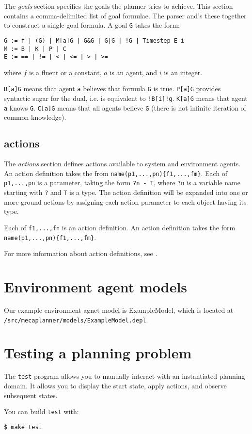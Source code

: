 \documentclass{article}
\begin{document}
The \emph{goals} section specifies the goals the planner tries to achieve.
This section contains a comma-delimited list of goal formulae. The parser and's
these together to construct a single goal formula. A goal \verb|G| takes the form:

\begin{lstlisting}
G := f | (G) | M[a]G | G&G | G|G | !G | Timestep E i
M := B | K | P | C
E := == | != | < | <= | > | >=
\end{lstlisting}

\noindent
where $f$ is a fluent or a constant, $a$ is an agent, 
and $i$ is an integer.

\verb|B[a]G| means that agent \verb|a| believes that formula \verb|G| is true.
\verb|P[a]G| provides syntactic sugar for the dual, i.e. is equivalent to
\verb|!B[i]!g|.
\verb|K[a]G| means that agent \verb|a| knows \verb|G|.
\verb|C[a]G| means that all agents believe \verb|G| 
(there is not infinite iteration of common knowledge).


\subsection{actions}

The \emph{actions} section defines actions available to system and environment
agents. An action definition takes the from 
\verb|name(p1,...,pn){f1,...,fm}|.
Each of \verb|p1,...,pn| is a parameter, taking the form \verb|?n - T|, where
\verb|?n| is a variable name starting with \verb|?| and \verb|T| is a type.
The action definition will be expanded into one or more ground actions by
assigning each action parameter to each object having its type.

Each of \verb|f1,...,fn| is an action definition. An action definition
takes the form \verb|name(p1,...,pn){f1,...,fm}|.

For more information about action definitions, see
\cite{buckingham2021multiagent}.
 


\section{Environment agent models}

Our example environment agnet model is ExampleModel, which is located at
\texttt{/src/mecaplanner/models/ExampleModel.depl}.




\section{Testing a planning problem}
The \verb|test| program allows you to manually interact with an instantiated planning domain.
It allows you to display the start state, apply actions, and observe subsequent
states.

You can build \verb|test| with:

\begin{lstlisting}
$ make test
\end{lstlisting}


\end{document}
